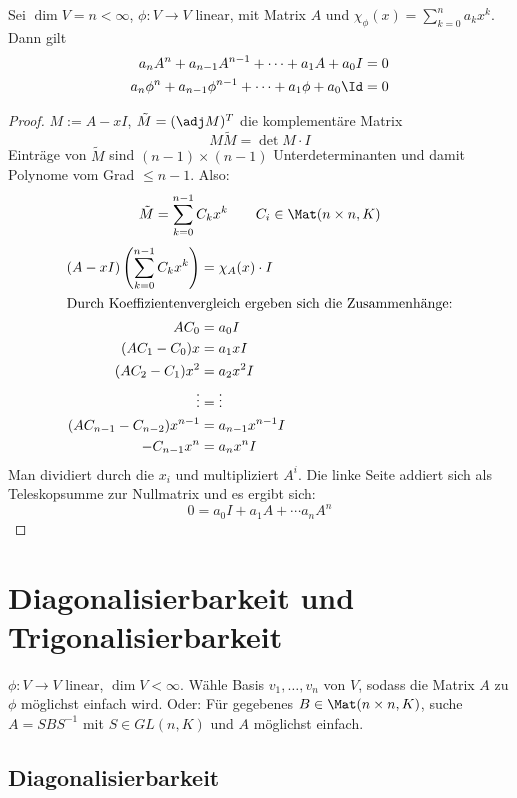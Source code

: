 \documentclass[a4paper, 10pt]{scrbook}
\begin{document}
\begin{thm}
\label{thm:10.17}
Sei $\dim V=n<\infty$, $\phi:V\to V$ linear, mit Matrix $A$ und $\chi_\phi(x)=\sum_{k=0}^na_kx^k$.
Dann gilt
\begin{align*}
a_nA^n+a_{n-1}A^{n-1}+\dotsb+a_1A+a_0I&=0\\
a_n\phi^n+a_{n-1}\phi^{n-1}+\dotsb+a_1\phi+a_0\Id&=0
\end{align*}

\begin{proof}
$M:=A-xI$, $\tilde M = (\adj M)^T$ die komplementäre Matrix
\[
M\tilde M = \det M \cdot I
\]
Einträge von $\tilde M$ sind $(n-1)\times(n-1)$ Unterdeterminanten und damit Polynome vom Grad $\le n-1$.
Also:
\begin{align*}
\tilde M = \sum_{k=0}^{n-1}C_{k}x^{k} \qquad C_i\in \Mat(n\times n, K)
\end{align*}
\begin{align*}
(A-xI)\left(\sum_{k=0}^{n-1}C_k x^k\right) &= \chi_A(x)\cdot I\\
	\intertext{Durch Koeffizientenvergleich ergeben sich die Zusammenhänge:}
								A C_0 &= a_0 I\\
(AC_1-C_0)x &= a_1xI\\
(AC_2-C_1)x^2 &= a_2x^2I\\
\vdots &= \vdots\\
(AC_{n-1}-C_{n-2})x^{n-1} &= a_{n-1}x^{n-1}I\\
-C_{n-1}x^n &= a_nx^nI
\end{align*}
Man dividiert durch die $x_i$ und multipliziert $A^i$.
Die linke Seite addiert sich als Teleskopsumme zur Nullmatrix und es ergibt sich:
\[
0 = a_0I + a_1A+\dotsb a_nA^n
\]
\end{proof}
\end{thm}


\chapter{Diagonalisierbarkeit und Trigonalisierbarkeit}



$\phi: V\to V$ linear, $\dim V < \infty$.
Wähle Basis $v_1,\dotsc, v_n$ von $V$, sodass die Matrix $A$ zu $\phi$ möglichst einfach wird.
Oder: Für gegebenes $B\in \Mat(n\times n, K)$, suche $A=SBS^{-1}$ mit $S\in GL(n,K)$ und $A$ möglichst einfach.

\section{Diagonalisierbarkeit}
\end{document}
